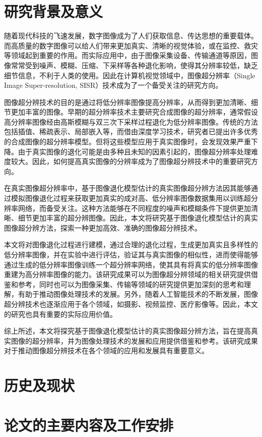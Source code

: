\section{研究背景及意义}
随着现代科技的飞速发展，数字图像成为了人们获取信息、传达思想的重要载体。而高质量的数字图像可以给人们带来更加真实、清晰的视觉体验，或在监控、救灾等领域起到重要的作用。而实际应用中，由于图像采集设备、传输通道等原因，图像常常受到噪声、模糊、压缩、下采样等各种退化影响，使得其分辨率较低，缺乏细节信息，不利于人类的使用。因此在计算机视觉领域中，图像超分辨率（Single Image Super-resolution, SISR）技术成为了一个备受关注的研究方向。

图像超分辨技术的目的是通过将低分辨率图像提高分辨率，从而得到更加清晰、细节更加丰富的图像。早期的超分辨率技术主要研究合成图像的超分辨率，通常假设高分辨率图像经由高斯模糊与双三次下采样过程退化为低分辨率图像。传统的方法包括插值、稀疏表示、局部嵌入等，而借由深度学习技术，研究者已提出许多优秀的合成图像的超分辨率模型。但将这些模型应用于真实图像时，会发现效果严重下降。由于真实图像的退化可能是由多种且未知的因素引起的，图像超分辨率处理难度较大。因此，如何提高真实图像的分辨率成为了图像超分辨技术中的重要研究方向。

在真实图像超分辨率中，基于图像退化模型估计的真实图像超分辨方法因其能够通过模拟图像退化过程来获取更加真实的成对高、低分辨率图像数据集用以训练超分辨率网络，而备受关注。这种方法能够在不同程度的噪声和模糊条件下提供更加清晰、细节更加丰富的超分辨图像。因此，本文将研究基于图像退化模型估计的真实图像超分辨方法，探索一种更加高效、准确的图像超分辨技术。

本文将对图像退化过程进行建模，通过合理的退化过程，生成更加真实且多样性的低分辨率图像，并在实验中进行评估，验证其与真实图像的相似性，进而使得能够通过生成的低分辨率图像训练一个超分辨率网络，使其具有将真实的低分辨率图像重建为高分辨率图像的能力。该研究成果可以为图像超分辨领域的相关研究提供借鉴和参考，同时也可以为图像采集、传输等领域的研究提供更加深刻的思考和理解，有助于推动图像处理技术的发展。另外，随着人工智能技术的不断发展，图像超分辨技术也逐渐应用于各个领域，如摄影、视频监控、医疗影像等。因此，本文的研究也具有重要的实际应用价值。

综上所述，本文将探究基于图像退化模型估计的真实图像超分辨方法，旨在提高真实图像的超分辨率，并为图像处理技术的发展和应用提供借鉴和参考。该研究成果对于推动图像超分辨技术在各个领域的应用和发展具有重要意义。
\section{历史及现状}

\section{论文的主要内容及工作安排}